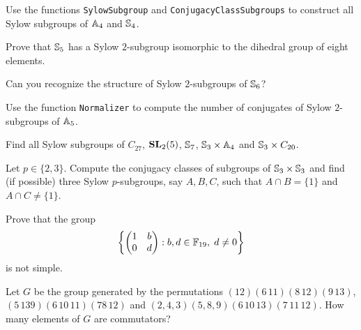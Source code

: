 \begin{prob}
  Use the functions \lstinline{SylowSubgroup} and 
  \lstinline{ConjugacyClassSubgroups} to construct all Sylow subgroups 
  of $\mathbb{A}_4$ and $\mathbb{S}_4$.
\end{prob}

\begin{prob}
  Prove that $\mathbb{S}_5$ has a Sylow $2$-subgroup isomorphic to the dihedral group
  of eight elements. 
\end{prob}

\begin{prob}
  Can you recognize the structure of Sylow $2$-subgroups of $\mathbb{S}_6$?
\end{prob}

\begin{prob}
  Use the function \lstinline{Normalizer} to compute the number of conjugates
  of Sylow $2$-subgroups of $\mathbb{A}_5$. 
\end{prob}

\begin{prob}
    Find all Sylow subgroups of $C_{27}$, $\mathbf{SL}_2(5)$,
    $\mathbb{S}_7$, $\mathbb{S}_3\times\mathbb{A}_4$ and $\mathbb{S}_3\times C_{20}$. 
\end{prob}

\begin{prob}
    Let $p\in\{2,3\}$. 
  Compute the conjugacy classes of subgroups of $\mathbb{S}_3\times\mathbb{S}_3$ and find
  (if possible) 
  three Sylow $p$-subgroups, say $A,B,C$, such that $A\cap B=\{1\}$ and $A\cap
  C\ne\{1\}$.
\end{prob}

\begin{prob}
    Prove that the group
    \[
        \left\{\begin{pmatrix}
            1&b\\
            0&d
        \end{pmatrix}
        :b,d\in\mathbb{F}_{19},\;d\ne0
        \right\}
    \]
    is not simple.
\end{prob}

\begin{prob}
    Let $G$ be the group generated by the permutations 
    $(12)(6\,11)(8\,12)(9\,13)$, $(5\,139)(6\,10\,11)(78\,12)$ and 
    $(2,4,3)(5,8,9)(6\,10\,13)(7\,11\,12)$. 
    How many elements of $G$ are commutators?
\end{prob}

